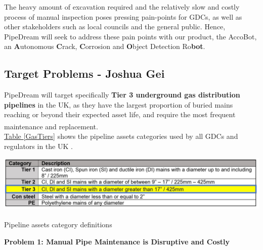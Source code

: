 \documentclass[11pt]{article}		%
\newcommand{\supercite}[1]{\textsuperscript{\cite{#1}}}		%
\newcommand{\tableref}[1]{\hyperref[#1]{Table \ref*{#1}}}     %
\begin{document}
		\vspace{-0.75cm}
		The heavy amount of excavation required and the relatively slow and costly process of manual inspection poses pressing pain-points for GDCs, as well as other stakeholders such as local councils and the general public. Hence, PipeDream will seek to address these pain points with our product, the AccoBot, an \textbf{A}utonomous \textbf{C}rack, \textbf{C}orrosion and \textbf{O}bject Detection Ro\textbf{bot}.
		
	\subsection[Target Problems]{Target Problems - Joshua Gei}
	
	PipeDream will target specifically \textbf{Tier 3 underground gas distribution pipelines} in the UK, as they have the largest proportion of buried mains reaching or beyond their expected asset life, and require the most frequent maintenance and replacement\supercite{tier3}.
	\\
	\tableref{GasTiers} shows the pipeline assets categories used by all GDCs and regulators in the UK .
		\begin{table}[h]
			\centering
			\includegraphics[width=\textwidth]{GasTiers}
			\caption{Pipeline assets category definitions\supercite{tier3}}
			\label{GasTiers}
 		\end{table}
 	
    \textbf{Problem 1: Manual Pipe Maintenance is Disruptive and Costly}
    
\end{document}
